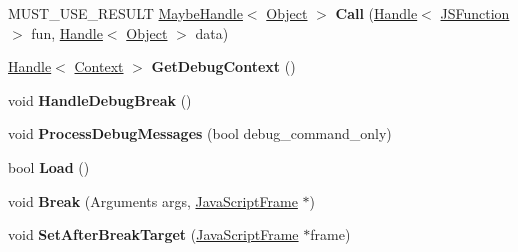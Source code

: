 \begin{DoxyCompactItemize}
\item 
\hypertarget{classv8_1_1internal_1_1_debug_a4b9937084a2b005a33a4a6991414d9eb}{}M\+U\+S\+T\+\_\+\+U\+S\+E\+\_\+\+R\+E\+S\+U\+L\+T \hyperlink{classv8_1_1internal_1_1_maybe_handle}{Maybe\+Handle}$<$ \hyperlink{classv8_1_1internal_1_1_object}{Object} $>$ {\bfseries Call} (\hyperlink{classv8_1_1internal_1_1_handle}{Handle}$<$ \hyperlink{classv8_1_1internal_1_1_j_s_function}{J\+S\+Function} $>$ fun, \hyperlink{classv8_1_1internal_1_1_handle}{Handle}$<$ \hyperlink{classv8_1_1internal_1_1_object}{Object} $>$ data)\label{classv8_1_1internal_1_1_debug_a4b9937084a2b005a33a4a6991414d9eb}

\item 
\hypertarget{classv8_1_1internal_1_1_debug_a061d85033a27029cee4a89941795b93b}{}\hyperlink{classv8_1_1internal_1_1_handle}{Handle}$<$ \hyperlink{classv8_1_1internal_1_1_context}{Context} $>$ {\bfseries Get\+Debug\+Context} ()\label{classv8_1_1internal_1_1_debug_a061d85033a27029cee4a89941795b93b}

\item 
\hypertarget{classv8_1_1internal_1_1_debug_a886aab9f010b49880ffe22dd3ebfe192}{}void {\bfseries Handle\+Debug\+Break} ()\label{classv8_1_1internal_1_1_debug_a886aab9f010b49880ffe22dd3ebfe192}

\item 
\hypertarget{classv8_1_1internal_1_1_debug_aba6da5c23836a3d3dd2a5a02a57df0d3}{}void {\bfseries Process\+Debug\+Messages} (bool debug\+\_\+command\+\_\+only)\label{classv8_1_1internal_1_1_debug_aba6da5c23836a3d3dd2a5a02a57df0d3}

\item 
\hypertarget{classv8_1_1internal_1_1_debug_a24f38cc4dba4a003dea1aad6a0031ec8}{}bool {\bfseries Load} ()\label{classv8_1_1internal_1_1_debug_a24f38cc4dba4a003dea1aad6a0031ec8}

\item 
\hypertarget{classv8_1_1internal_1_1_debug_a4d85029c17da5a3b66d73e573397eeea}{}void {\bfseries Break} (Arguments args, \hyperlink{classv8_1_1internal_1_1_java_script_frame}{Java\+Script\+Frame} $\ast$)\label{classv8_1_1internal_1_1_debug_a4d85029c17da5a3b66d73e573397eeea}

\item 
\hypertarget{classv8_1_1internal_1_1_debug_ac19235bcda6fb191a5e496de2213fc70}{}void {\bfseries Set\+After\+Break\+Target} (\hyperlink{classv8_1_1internal_1_1_java_script_frame}{Java\+Script\+Frame} $\ast$frame)\label{classv8_1_1internal_1_1_debug_ac19235bcda6fb191a5e496de2213fc70}


\end{DoxyCompactItemize}
